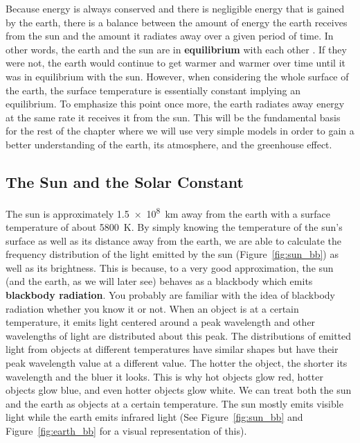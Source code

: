     Because energy is always conserved and there is negligible energy that is gained by the earth, there is a balance between the amount of energy the earth receives from the sun and the amount it radiates away over a given period of time. In other words, the earth and the sun are in \textbf{equilibrium} with each other \citep{thorndike1976energy}. If they were not, the earth would continue to get warmer and warmer over time until it was in equilibrium with the sun. However, when considering the whole surface of the earth, the surface temperature is essentially constant implying an equilibrium. To emphasize this point once more, the earth radiates away energy at the same rate it receives it from the sun. This will be the fundamental basis for the rest of the chapter where we will use very simple models in order to gain a better understanding of the earth, its atmosphere, and the greenhouse effect.


        \subsection{The Sun and the Solar Constant} %
        \label{sub:the_sun}
        
        The sun is approximately \SI{1.5e8}{\km} away from the earth with a surface temperature of about \SI{5800}{\kelvin}. By simply knowing the temperature of the sun's surface as well as its distance away from the earth, we are able to calculate the frequency distribution of the light emitted by the sun (Figure~\ref{fig:sun_bb}) as well as its brightness. This is because, to a very good approximation, the sun (and the earth, as we will later see) behaves as a blackbody which emits \textbf{blackbody radiation}. You probably are familiar with the idea of blackbody radiation whether you know it or not. When an object is at a certain temperature, it emits light centered around a peak wavelength and other wavelengths of light are distributed about this peak. The distributions of emitted light from objects at different temperatures have similar shapes but have their peak wavelength value at a different value. The hotter the object, the shorter its wavelength and the bluer it looks. This is why hot objects glow red, hotter objects glow blue, and even hotter objects glow white. We can treat both the sun and the earth as objects at a certain temperature. The sun mostly emits visible light while the earth emits infrared light (See Figure~\ref{fig:sun_bb} and Figure~\ref{fig:earth_bb} for a visual representation of this).

